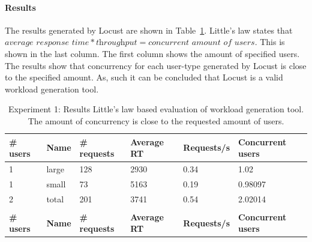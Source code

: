 \paragraph{Results}
The results generated by Locust are shown in Table~\ref{tab:locust}. Little's law states that $\textit{average response time} * \textit{throughput} = \textit{concurrent amount of users}$. This is shown in the last column. The first column shows the amount of specified users. The results show that concurrency for each user-type generated by Locust is close to the specified amount. As, such it can be concluded that Locust is a valid workload generation tool.
\begin{table}[H]
\caption {Experiment 1: Results Little's law based evaluation of workload generation tool. The amount of concurrency is close to the requested amount of users.} \label{tab:locust} 
\begin{tabular}{llllll}
\hline
\multicolumn{1}{|l|}{\textbf{\# users}}  & \multicolumn{1}{l|}{\textbf{Name}} & \multicolumn{1}{l|}{\textbf{\# requests}} & \multicolumn{1}{l|}{\textbf{Average RT}} & \multicolumn{1}{l|}{\textbf{Requests/s}} & \multicolumn{1}{l|}{\textbf{Concurrent users}} \\ \hline
\multicolumn{1}{|l|}{1}                  & \multicolumn{1}{l|}{large}          & \multicolumn{1}{l|}{128}                  & \multicolumn{1}{l|}{2930}                & \multicolumn{1}{l|}{0.34}                & \multicolumn{1}{l|}{1.02}                      \\ \hline
\multicolumn{1}{|l|}{1}                  & \multicolumn{1}{l|}{small}        & \multicolumn{1}{l|}{73}                   & \multicolumn{1}{l|}{5163}                & \multicolumn{1}{l|}{0.19}                & \multicolumn{1}{l|}{0.98097}                   \\ \hline
\multicolumn{1}{|l|}{2}                  & \multicolumn{1}{l|}{total}         & \multicolumn{1}{l|}{201}                  & \multicolumn{1}{l|}{3741}                & \multicolumn{1}{l|}{0.54}                & \multicolumn{1}{l|}{2.02014}                   \\ \hline
                                         &                                    &                                           &                                          &                                          &                                                \\ \hline
\multicolumn{1}{|l|}{\textbf{\# users}}  & \multicolumn{1}{l|}{\textbf{Name}} & \multicolumn{1}{l|}{\textbf{\# requests}} & \multicolumn{1}{l|}{\textbf{Average RT}} & \multicolumn{1}{l|}{\textbf{Requests/s}} & \multicolumn{1}{l|}{\textbf{Concurrent users}} \\ \hline

\end{tabular}
\end{table}
